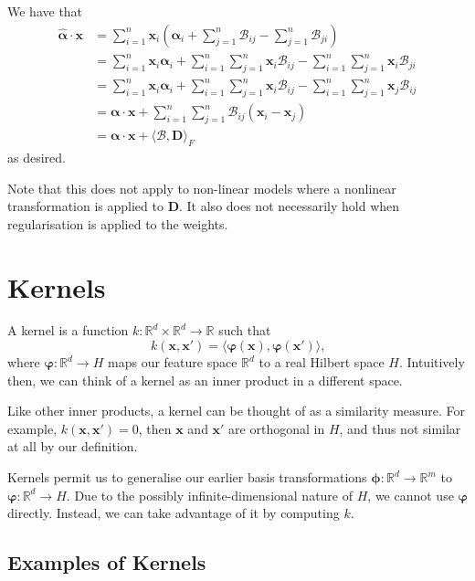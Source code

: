 \documentclass[11pt,twoside]{report}
\newcommand\bphi{\bm{\phi}}
\newcommand\bvarphi{\bm{\varphi}}
\newcommand\bbR{\mathbb{R}}
\newcommand\bx{\mathbf{x}}
\begin{document}
We have that\begin{align*}
    \hat{\bm{\alpha}} \cdot \mathbf{x} &= \sum_{i=1}^n \mathbf{x}_i\left( \bm{\alpha}_i + \sum_{j=1}^n \mathcal{B}_{ij} - \sum_{j=1}^n \mathcal{B}_{ji} \right) \\
    &= \sum_{i=1}^n \mathbf{x}_i\bm{\alpha}_i +  \sum_{i=1}^n \sum_{j=1}^n \mathbf{x}_i \mathcal{B}_{ij} - \sum_{i=1}^n \sum_{j=1}^n \mathbf{x}_i \mathcal{B}_{ji} \\
    &= \sum_{i=1}^n \mathbf{x}_i\bm{\alpha}_i +  \sum_{i=1}^n \sum_{j=1}^n \mathbf{x}_i \mathcal{B}_{ij} - \sum_{i=1}^n \sum_{j=1}^n \mathbf{x}_j \mathcal{B}_{ij} \\
    &= \bm{\alpha}\cdot\mathbf{x} +  \sum_{i=1}^n \sum_{j=1}^n \mathcal{B}_{ij} \left(\mathbf{x}_i - \mathbf{x}_j \right) \\
    &= \bm{\alpha}\cdot\mathbf{x} + \langle \mathcal{B}, \mathbf{D} \rangle_F
\end{align*} as desired.

Note that this does not apply to non-linear models where a nonlinear transformation is applied to $\mathbf{D}$. It also does not necessarily hold when regularisation is applied to the weights.

\section{Kernels}

A kernel is a function $k : \bbR^d \times \bbR^d \to \bbR$ such that \[
    k(\bx, \bx') = \langle \bvarphi\left(\bx\right), \bvarphi\left(\bx'\right)\rangle \text{,}
\] where $\bvarphi : \bbR^d \to H$ maps our feature space $\bbR^d$ to a real Hilbert space $H$. Intuitively then, we can think of a kernel as an inner product in a different space.

Like other inner products, a kernel can be thought of as a similarity measure. For example, $k(\bx, \bx') = 0$, then $\bx$ and $\bx'$ are orthogonal in $H$, and thus not similar at all by our definition.

Kernels permit us to generalise our earlier basis transformations $\bphi : \bbR^d \to \bbR^m$ to $\bvarphi : \bbR^d \to H$. Due to the possibly infinite-dimensional nature of $H$, we cannot use $\bvarphi$ directly. Instead, we can take advantage of it by computing $k$.

\subsection{Examples of Kernels}
\end{document}
